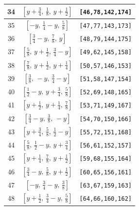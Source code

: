 \documentclass[fleqn,8pt]{jsarticle}
\begin{document}
\begin{longtable}{ccc}
34 & $\left[ y + \frac{3}{4},\, \frac{1}{8},\, y + \frac{1}{2} \right]$ & {\tt [46,78,142,174]} \\ \hline
35 & $\left[ - y,\, \frac{1}{4} - y,\, \frac{5}{8} \right]$ & {\tt [47,77,143,173]} \\ \hline
36 & $\left[ \frac{3}{4} - y,\, \frac{7}{8},\, y \right]$ & {\tt [48,79,144,175]} \\ \hline
37 & $\left[ \frac{5}{8},\, y + \frac{1}{2},\, \frac{3}{4} - y \right]$ & {\tt [49,62,145,158]} \\ \hline
38 & $\left[ \frac{7}{8},\, y + \frac{1}{2},\, y + \frac{1}{4} \right]$ & {\tt [50,57,146,153]} \\ \hline
39 & $\left[ \frac{3}{8},\, - y,\, \frac{3}{4} - y \right]$ & {\tt [51,58,147,154]} \\ \hline
40 & $\left[ \frac{1}{2} - y,\, y + \frac{3}{4},\, \frac{5}{8} \right]$ & {\tt [52,69,148,165]} \\ \hline
41 & $\left[ y + \frac{1}{2},\, y + \frac{1}{4},\, \frac{7}{8} \right]$ & {\tt [53,71,149,167]} \\ \hline
42 & $\left[ \frac{3}{4} - y,\, \frac{3}{8},\, - y \right]$ & {\tt [54,70,150,166]} \\ \hline
43 & $\left[ y + \frac{3}{4},\, \frac{5}{8},\, \frac{1}{2} - y \right]$ & {\tt [55,72,151,168]} \\ \hline
44 & $\left[ \frac{5}{8},\, \frac{1}{2} - y,\, y + \frac{3}{4} \right]$ & {\tt [56,61,152,157]} \\ \hline
45 & $\left[ y + \frac{1}{4},\, \frac{7}{8},\, y + \frac{1}{2} \right]$ & {\tt [59,68,155,164]} \\ \hline
46 & $\left[ \frac{3}{4} - y,\, \frac{5}{8},\, y + \frac{1}{2} \right]$ & {\tt [60,65,156,161]} \\ \hline
47 & $\left[ - y,\, \frac{3}{4} - y,\, \frac{3}{8} \right]$ & {\tt [63,67,159,163]} \\ \hline
48 & $\left[ y + \frac{1}{2},\, \frac{3}{4} - y,\, \frac{5}{8} \right]$ & {\tt [64,66,160,162]} \\
\end{longtable}
\renewcommand{\arraystretch}{1.2}
\end{document}
